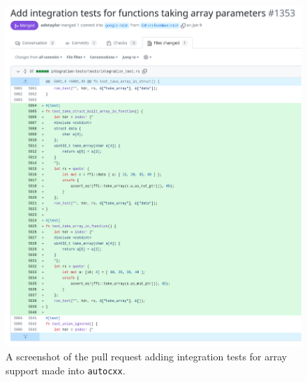 \begin{figure}[H]
    \centering
    \includegraphics[width=\textwidth]{images/8_appendix/autocxx_pr.png}
    \caption{A screenshot of the pull request adding integration tests for array support made into \texttt{autocxx}.}
    \label{fig:autocxx_pr}
\end{figure}